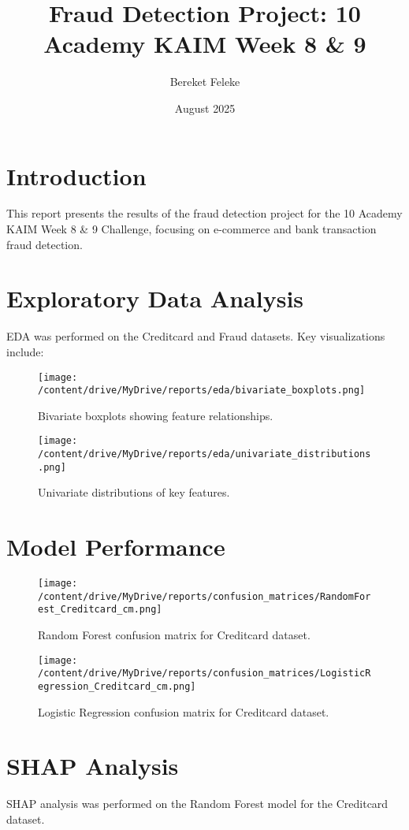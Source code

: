 \documentclass{article}
\title{Fraud Detection Project: 10 Academy KAIM Week 8 \& 9}
\author{Bereket Feleke}
\date{August 2025}
\begin{document}
\maketitle

\section{Introduction}
This report presents the results of the fraud detection project for the 10 Academy KAIM Week 8 \& 9 Challenge, focusing on e-commerce and bank transaction fraud detection.

\section{Exploratory Data Analysis}
EDA was performed on the Creditcard and Fraud datasets. Key visualizations include:

\begin{figure}[h]
\centering
\texttt{[image: /content/drive/MyDrive/reports/eda/bivariate\_boxplots.png]}
\caption{Bivariate boxplots showing feature relationships.}
\end{figure}

\begin{figure}[h]
\centering
\texttt{[image: /content/drive/MyDrive/reports/eda/univariate\_distributions.png]}
\caption{Univariate distributions of key features.}
\end{figure}

\section{Model Performance}
\footnotesize


\begin{figure}[h]
\centering
\texttt{[image: /content/drive/MyDrive/reports/confusion\_matrices/RandomForest\_Creditcard\_cm.png]}
\caption{Random Forest confusion matrix for Creditcard dataset.}
\end{figure}

\begin{figure}[h]
\centering
\texttt{[image: /content/drive/MyDrive/reports/confusion\_matrices/LogisticRegression\_Creditcard\_cm.png]}
\caption{Logistic Regression confusion matrix for Creditcard dataset.}
\end{figure}

\section{SHAP Analysis}
SHAP analysis was performed on the Random Forest model for the Creditcard dataset.
\end{document}
